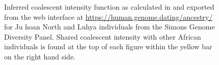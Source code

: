 \begin{figure}
	\centering
	\hfill
	\caption{Inferred coalescent intensity function as calculated in \textcite{Albers2019} and exported from the web interface at \url{https://human.genome.dating/ancestry/} for Ju hoan North and Luhya individuals from the Simons Genome Diversity Panel. Shared coalescent intensity with other African individuals is found at the top of each figure within the yellow bar on the right hand side. }
	\end{figure}


